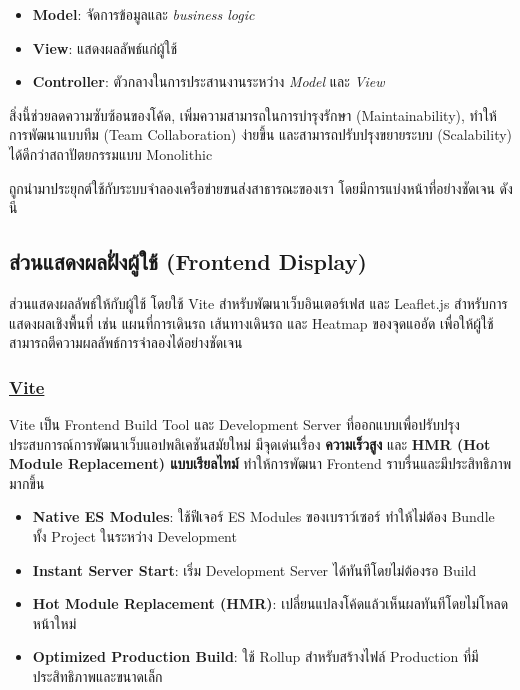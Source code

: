 \begin{itemize}
  \item \textbf{Model}: จัดการข้อมูลและ \textit{business logic}
  \item \textbf{View}: แสดงผลลัพธ์แก่ผู้ใช้
  \item \textbf{Controller}: ตัวกลางในการประสานงานระหว่าง \textit{Model} และ \textit{View}
\end{itemize}

สิ่งนี้ช่วยลดความซับซ้อนของโค้ด, เพิ่มความสามารถในการบำรุงรักษา (Maintainability), 
ทำให้การพัฒนาแบบทีม (Team Collaboration) ง่ายขึ้น และสามารถปรับปรุงขยายระบบ (Scalability) 
ได้ดีกว่าสถาปัตยกรรมแบบ Monolithic

\indent ถูกนำมาประยุกต์ใช้กับระบบจำลองเครือข่ายขนส่งสาธารณะของเรา โดยมีการแบ่งหน้าที่อย่างชัดเจน ดังนี

\subsection{ส่วนแสดงผลฝั่งผู้ใช้ (Frontend Display)}
\begin{mypara}
    \indent ส่วนแสดงผลลัพธ์ให้กับผู้ใช้ โดยใช้ Vite
สำหรับพัฒนาเว็บอินเตอร์เฟส และ Leaflet.js สำหรับการแสดงผลเชิงพื้นที่ 
เช่น แผนที่การเดินรถ เส้นทางเดินรถ และ Heatmap ของจุดแออัด 
เพื่อให้ผู้ใช้สามารถตีความผลลัพธ์การจำลองได้อย่างชัดเจน
\end{mypara}

\subsubsection{\textbf{\underline{Vite}}}
    \begin{mypara}
        \indent Vite เป็น Frontend Build Tool และ Development Server ที่ออกแบบเพื่อปรับปรุงประสบการณ์การพัฒนาเว็บแอปพลิเคชันสมัยใหม่ มีจุดเด่นเรื่อง \textbf{ความเร็วสูง} และ \textbf{HMR (Hot Module Replacement) แบบเรียลไทม์} ทำให้การพัฒนา Frontend ราบรื่นและมีประสิทธิภาพมากขึ้น  
    \end{mypara}

\begin{itemize}
    \item \textbf{Native ES Modules}: ใช้ฟีเจอร์ ES Modules ของเบราว์เซอร์ ทำให้ไม่ต้อง Bundle ทั้ง Project ในระหว่าง Development
    \item \textbf{Instant Server Start}: เริ่ม Development Server ได้ทันทีโดยไม่ต้องรอ Build
    \item \textbf{Hot Module Replacement (HMR)}: เปลี่ยนแปลงโค้ดแล้วเห็นผลทันทีโดยไม่โหลดหน้าใหม่
    \item \textbf{Optimized Production Build}: ใช้ Rollup สำหรับสร้างไฟล์ Production ที่มีประสิทธิภาพและขนาดเล็ก
\end{itemize}

